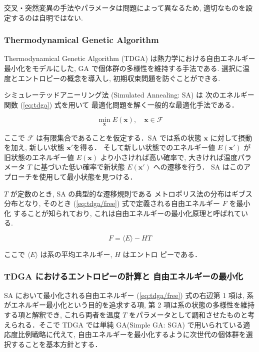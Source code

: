 交叉・突然変異の手法やパラメータは問題によって異なるため, 適切なものを設定するのは自明ではない.



\changeindent{0cm}
\subsubsection{Thermodynamical Genetic Algorithm}
\changeindent{2cm}
\label{sec:02_tdga}

Thermodynamical Genetic Algorithm (TDGA) \cite{kita1996multi} は熱力学における自由エネルギー最小化をモデルにした,
GA で個体群の多様性を維持する手法である.
選択に温度とエントロピーの概念を導入し, 初期収束問題を防ぐことができる.

シミュレーテッドアニーリング法 (Simulated Annealing: SA) は
次のエネルギー関数 (\ref{eq:tdga}) 式を用いて
最適化問題を解く一般的な最適化手法である．

\begin{equation}
  \label{eq:tdga}
  \min_{\bm{x}} E(\bm{x}), \quad
  \bm{x} \in \mathcal{F}
\end{equation}

\noindent
ここで $\mathcal{F}$ は有限集合であることを仮定する．SA
では系の状態 $\bm{x}$ に対して摂動を加え, 新しい状態 $\bm{x}'$を得る．
そして新しい状態でのエネルギー値 $E(\bm{x}')$ が
旧状態のエネルギー値 $E(\bm{x})$ より小さければ高い確率で,
大きければ温度パラメータ $T$ に基づいた低い確率で新状態 $E(\bm{x}')$ への遷移を行う．
SA はこのアプローチを使用して最小状態を見つける．


$T$ が定数のとき, SA の典型的な遷移規則である
メトロポリス法の分布はギブス分布となり, そのとき
(\ref{eq:tdga/free}) 式で定義される自由エネルギー $F$ を最小化
することが知られており, これは自由エネルギーの最小化原理と呼ばれている.

\begin{equation}
  \label{eq:tdga/free}
  F = \langle E \rangle - HT
\end{equation}

\noindent
ここで $\langle E \rangle$ は系の平均エネルギー, $H$ はエントロ
ピーである．


\subsubsection*{TDGA におけるエントロピーの計算と
自由エネルギーの最小化}


SA において最小化される自由エネルギー (\ref{eq:tdga/free}) 式の右辺第 1 項は, 系がエネルギー最小化という目的を追求する項, 第 2 項は系の状態の多様性を維持する項と解釈でき, これら両者を温度 $T$ をパラメータとして調和させたものと考えられる．そこで TDGA では単純 GA(Simple GA: SGA) で用いられている適応度比例戦略に代えて, 自由エネルギーを最小化するように次世代の個体群を選択することを基本方針とする．


